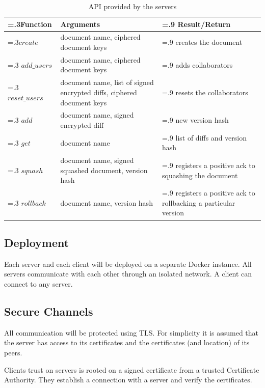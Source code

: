 \begin{table}[ht]
    \centering
    \caption{API provided by the servers}
    \begin{tabularx}{\textwidth}{>{\hsize=.3\hsize}X | X | >{\hsize=.9\hsize}X }
        \hline
        \textbf{Function} & \textbf{Arguments} & \textbf{Result/Return} \\
        \hline
        $create$ & document name, ciphered document keys & creates the document \\
        \hline
        $add\_users$ & document name, ciphered document keys & adds collaborators  \\
        \hline
        $reset\_users$ & document name, list of signed encrypted diffs, ciphered document keys & resets the collaborators  \\
        \hline
        $add$ & document name, signed encrypted diff & new version hash \\
        \hline
        $get$ & document name & list of diffs and version hash \\
        \hline
        $squash$ & document name, signed squashed document, version hash & registers a positive ack to squashing the document\\
        \hline
        $rollback$ & document name, version hash & registers a positive ack to rollbacking a particular version\\
        \hline
    \end{tabularx}
    \label{tab:api}
\end{table}

\subsection{Deployment}

Each server and each client will be deployed on a separate
Docker instance.  All servers communicate with each other through an isolated network.
A client can connect to any server.

\subsection{Secure Channels}

All communication will be protected using TLS. For simplicity it
is assumed that the server has access to its certificates and the
certificates (and location) of its peers.

Clients trust on servers is rooted on a signed certificate from a
trusted Certificate Authority. They establish a connection with a
server and verify the certificates.

